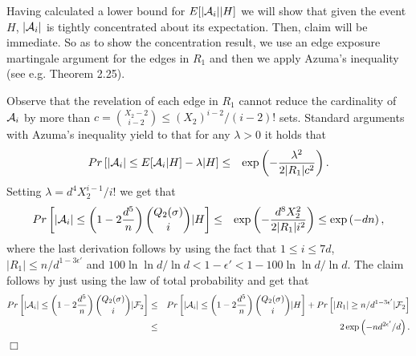 \documentclass[a4paper,10pt]{article}
\makeatletter
\newenvironment{claimproof}[1]{\noindent{\bf Proof of Claim #1\@:}}{\hfill $\Box$\\}
\makeatother
\begin{document}
\begin{claimproof}{\ref{claim:GoodFraction}}
\noindent
Having calculated a lower bound for $E[|{\cal A}_i||H]$ we will show that
given the event $H$,  $|{\cal A}_i|$ is tightly concentrated about its 
expectation. Then, claim will be immediate. So as to show the concentration
result,  we use an edge exposure martingale argument for the edges in $R_1$ 
and then we apply Azuma's inequality (see e.g. \cite{janson} Theorem 2.25). 


Observe that the revelation of each edge in $R_1$ cannot reduce the
cardinality of ${\cal A}_i$ by more than $c={X_2-2 \choose i-2}\leq (X_2)^{i-2}/(i-2)!$
sets. Standard arguments with Azuma's inequality  yield to that for any 
$\lambda>0$ it holds that
\begin{eqnarray}
Pr\left[|{\cal A}_i|\leq E[{\cal A}_i|H]-\lambda|H\right ]
&\leq& \exp\left(-\frac{\lambda^2}{2|R_1|c^2}\right). \nonumber 
\end{eqnarray}
Setting $\lambda=d^4X_2^{i-1}/i!$ we get that
\begin{eqnarray}
Pr\left[|{\cal A}_i|\leq \left(1-2\frac{d^5}{n}\right){Q_2(\sigma) \choose i}|H\right ]
&\leq&
\exp\left(-\frac{d^8X_2^{2}}{2|R_1|i^2}\right) \leq \exp\left(-dn\right), 
\nonumber 
\end{eqnarray}
where the last derivation follows by using the fact that $1\leq i\leq 7 d$,
$|R_1|\leq n/d^{1-3\epsilon'}$ and $100\ln\ln d/\ln d<1-\epsilon'<1-100\ln\ln d/\ln d$. 
The claim follows by just using the law of total probability and get that
\begin{eqnarray}
Pr\left[|{\cal A}_i|\leq \left(1-2\frac{d^5}{n}\right){Q_2(\sigma) \choose i}|{\cal F}_2\right ]
&\leq& Pr\left[|{\cal A}_i|\leq \left(1-2\frac{d^5}{n}\right){Q_2(\sigma) \choose i}|H\right ]+
Pr\left[|R_1|\geq n/d^{1-3\epsilon'} |{\cal F}_2\right]    \nonumber \\
&\leq & 2\exp\left( -nd^{2\epsilon'}/d \right). \nonumber 
\end{eqnarray}
\end{claimproof}
\end{document}
